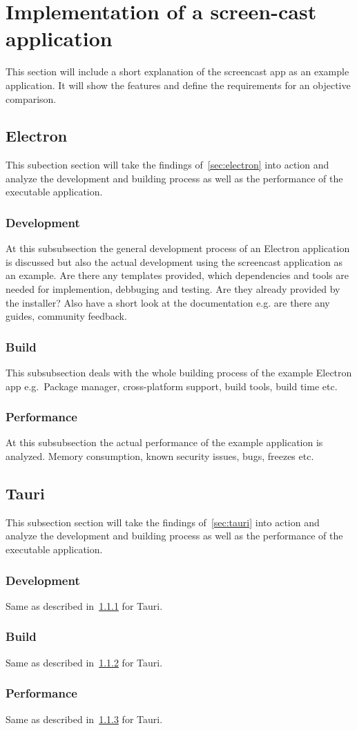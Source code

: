 \section{Implementation of a screen-cast application}
\label{sec:implementation}
This section will include a short explanation of the screencast app as an example application.
It will show the features and define the requirements for an objective comparison.

\subsection{Electron}
\label{subsec:impl:electron}
This subection section will take the findings of~\ref{sec:electron} into action and analyze the development and building process as well as the performance of the executable application.

\subsubsection{Development}
\label{subsubsec:impl:electron:dev}
At this subsubsection the general development process of an Electron application is discussed but also the actual development using the screencast
application as an example.
Are there any templates provided, which dependencies and tools are needed for implemention, debbuging and testing.
Are they already provided by the installer?
Also have a short look at the documentation e.g. are there any guides, community feedback.

\subsubsection{Build}
\label{subsubsec:impl:electron:build}
This subsubsection deals with the whole building process of the example Electron app e.g.\ Package manager, cross-platform support, build tools, build time etc.

\subsubsection{Performance}
\label{subsubsec:impl:electron:performance}
At this subsubsection the actual performance of the example application is analyzed.
Memory consumption, known security issues, bugs, freezes etc.

\subsection{Tauri}\label{subsec:impl:tauri}
This subsection section will take the findings of~\ref{sec:tauri} into action and analyze
the development and building process as well as the performance of the executable application.

\subsubsection{Development}
Same as described in~\ref{subsubsec:impl:electron:dev} for Tauri.
\subsubsection{Build}
Same as described in~\ref{subsubsec:impl:electron:build} for Tauri.
\subsubsection{Performance}
Same as described in~\ref{subsubsec:impl:electron:performance} for Tauri.